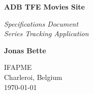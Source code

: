 \begin{titlepage}
    \begin{center}
        \vspace*{1cm}

        \textbf{ADB TFE Movies Site}

        \vspace{0.5cm}

        \textit{Specifications Document \\ \large Series Tracking Application}

        \vfill


        \vfill

        \textbf{Jonas Bette}

        \vspace{1.5cm}

        IFAPME \\
        Charleroi, Belgium \\
        \today
    \end{center}
\end{titlepage}
